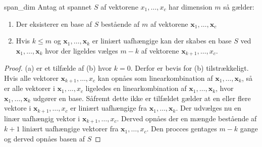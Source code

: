 \begin{thm}{}{span_dim}
Antag at spannet $S$ af vektorene $x_1,\ldots,x_c$ har dimension $m$ så gælder:
\begin{enumerate}[label=(\alph*)]
\item Der eksisterer en base af $S$ bestående af $m$ af vektorene $\mathbf{x}_1,\ldots,\mathbf{x}_c$ 
\item Hvis $k\leq m$ og $\mathbf{x}_1,\ldots,\mathbf{x}_k$ er liniært uafhængige kan der skabes en base $S$ ved $\mathbf{x}_1,\ldots,\mathbf{x}_k$ hvor der ligeldes vælges $m-k$ af vektorene $\mathbf{x}_{k+1},\ldots,x_c$.
\end{enumerate}
\end{thm}

\begin{proof}
(a) er et tilfælde af (b) hvor $k=0$. 
Derfor er bevis for (b) tilstrækkeligt.
Hvis alle vektorer $\mathbf{x}_{k+1},\ldots,x_c$ kan opnåes som linearkombination af $\mathbf{x}_1,\ldots,\mathbf{x}_k$, så er alle vektorer i $\mathbf{x}_{1},\ldots,x_c$ ligeledes en linearkombination af $\mathbf{x}_1,\ldots,\mathbf{x}_k$, hvor $\mathbf{x}_1,\ldots,\mathbf{x}_k$ udgører en base.
Såfremt dette ikke er tilfældet gælder at en eller flere vektore i $\mathbf{x}_{k+1},\ldots,x_c$ er liniært uafhængige fra $\mathbf{x}_1,\ldots,\mathbf{x}_k$. 
Der udvælges nu en linær uafhængig vektor i $\mathbf{x}_{k+1},\ldots,x_c$.
Derved opnåes der en mængde bestående af $k+1$ liniært uafhængige vektorer fra $\mathbf{x}_{1},\ldots,x_c$.
Den procces gentages $m-k$ gange og derved opnåes basen af $S$

\end{proof}